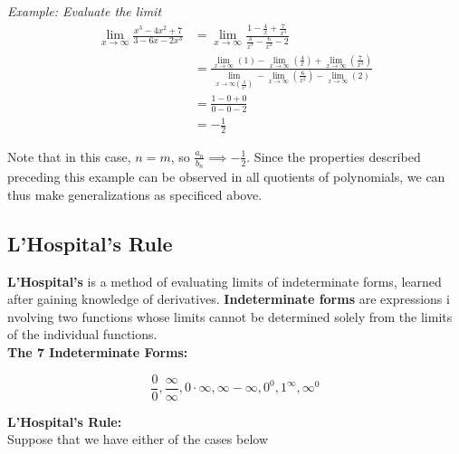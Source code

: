 \documentclass{article}
\begin{document}
            \noindent \color{blue} \textit{Example: Evaluate the limit} \color{black} \\

            \begin{align*}
                \lim_{x\to\infty}\frac{x^3-4x^2+7}{3-6x-2x^3} &=
                \lim_{x\to\infty}\frac{1-\frac{4}{x}+\frac{7}{x^3}}{\frac{3}{x^3}-\frac{6}{x^2}-2} \\
                &= \frac{\lim_{x\to\infty}(1)-\lim_{x\to\infty}\left(\frac{4}{x}\right)+\lim_{x\to\infty}\left(\frac{7}{x^3}\right)}{\lim_{x\to\infty\left(\frac{3}{x^3}\right)}-\lim_{x\to\infty}\left(\frac{6}{x^2}\right)-\lim_{x\to\infty}(2)} \\
                &= \frac{1-0+0}{0-0-2} \\
                &= -\frac{1}{2}
            \end{align*}

            \noindent Note that in this case, $n=m$, so $\frac{a_n}{b_n}\implies -\frac{1}{2}$.
            Since the properties described preceding this example can be observed in all quotients
            of polynomials, we can thus make generalizations as specificed above.


        \subsection{L'Hospital's Rule}
            \textbf{L'Hospital's} is a method of evaluating limits of indeterminate forms, learned
            after gaining knowledge of derivatives. \textbf{Indeterminate forms} are expressions i
            nvolving two functions whose limits cannot be determined solely from the limits of the
            individual functions. \\

            \noindent \color{purple} \textbf{The 7 Indeterminate Forms:} \\ \color{black}

            \begin{equation*}
                \frac{0}{0}, \frac{\infty}{\infty}, 0\cdot\infty, \infty-\infty, 0^0, 1^\infty, \infty^0
            \end{equation*}

            \noindent \color{purple} \textbf{L'Hospital's Rule:} \color{black} \\
            Suppose that we have either of the cases below \\
\end{document}
